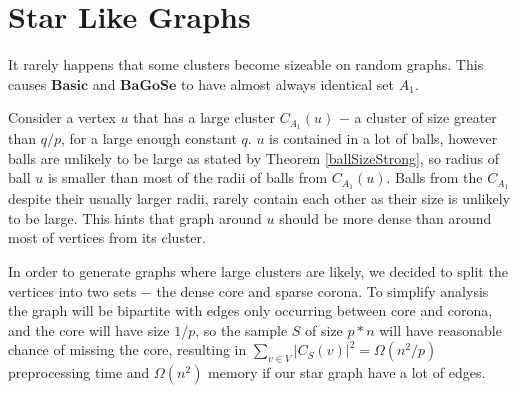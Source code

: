\documentclass[shortabstract, lic, english]{iithesis}
\theoremstyle{definition} \newtheorem{definition}{Definition}[chapter]
\theoremstyle{remark} \newtheorem{remark}[definition]{Observation}
\theoremstyle{plain} \newtheorem{theorem}[definition]{Theorem}
\theoremstyle{plain} \newtheorem{lemma}[definition]{Lemma}
\theoremstyle{plain} \newtheorem{conjecture}[definition]{Conjecture}
\begin{document}
\section{Star Like Graphs}

It rarely happens that some clusters become sizeable on random graphs.
This causes $\mathbf{Basic}$ and $\mathbf{BaGoSe}$ to have almost always identical set $A_1$.

Consider a vertex $u$ that has a large cluster $C_{A_1}(u)$ $-$ a cluster of size greater than $q/p$, for a large enough constant $q$.
$u$ is contained in a lot of balls, however balls are unlikely to be large as stated by Theorem \ref{ballSizeStrong},
so radius of ball $u$ is smaller than most of the radii of balls from $C_{A_1}(u)$. Balls from the $C_{A_1}$ despite their usually larger radii,
rarely contain each other as their size is unlikely to be large. This hints that graph around $u$ should be more dense than around most of vertices from its cluster.

In order to generate graphs where large clusters are likely, we decided to split the vertices into two sets $-$ the dense core and sparse corona.
To simplify analysis the graph will be bipartite with edges only occurring between core and corona,
and the core will have size $1/p$, so the sample $S$ of size $p * n$ will have reasonable chance of missing the core,
resulting in $\sum_{v \in V}|C_S(v)|^2 = \Omega(n^2/p)$ preprocessing time and $\Omega(n^2)$ memory if our star graph have a lot of edges.
\end{document}
